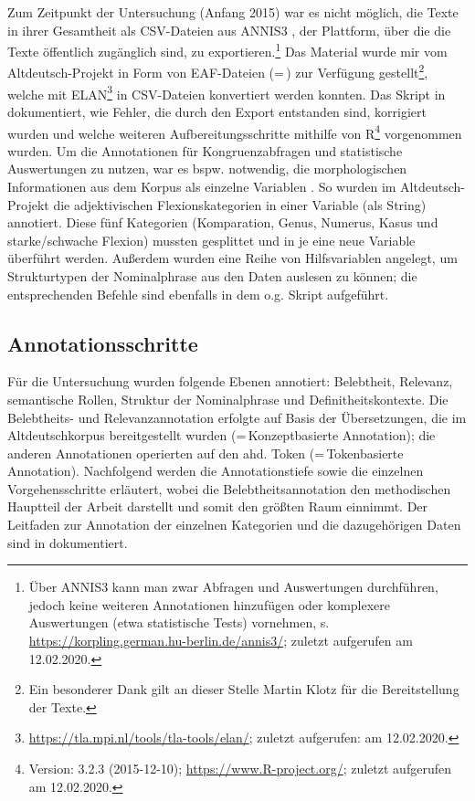 Zum Zeitpunkt der Untersuchung (Anfang 2015) war es nicht möglich, die Texte in ihrer Gesamtheit als CSV-Dateien aus ANNIS3 \parencite{Krause2016}, der Plattform, über die die Texte öffentlich zugänglich sind, zu exportieren.\footnote{Über ANNIS3 kann man zwar Abfragen und Auswertungen durchführen, jedoch keine weiteren Annotationen hinzufügen oder komplexere Auswertungen (etwa statistische Tests) vornehmen, s. \url{https://korpling.german.hu-berlin.de/annis3/}; zuletzt aufgerufen am 12.02.2020.} Das Material wurde mir vom Altdeutsch-Projekt in Form von EAF-Dateien (=\,) zur Verfügung gestellt\footnote{Ein besonderer Dank gilt an dieser Stelle Martin Klotz für die Bereitstellung der Texte.}, welche mit ELAN\footnote{\url{https://tla.mpi.nl/tools/tla-tools/elan/}; zuletzt aufgerufen: am 12.02.2020.} in CSV-Dateien konvertiert werden konnten. 
Das Skript  in \textcite{HZKYL4_2020} dokumentiert, wie Fehler, die durch den Export entstanden sind, korrigiert wurden und welche weiteren Aufbereitungsschritte mithilfe von R\footnote{Version: 3.2.3 (2015-12-10); \url{https://www.R-project.org/}; zuletzt aufgerufen am 12.02.2020.} vorgenommen wurden. 
Um die Annotationen für Kongruenzabfragen und statistische Auswertungen zu nutzen, war es bspw. notwendig, die morphologischen Informationen aus dem Korpus als einzelne Variablen . So wurden im Altdeutsch-Projekt die adjektivischen Flexionskategorien in einer Variable (als String)  annotiert. Diese fünf Kategorien (Komparation, Genus, Numerus, Kasus und starke/schwache Flexion) mussten gesplittet und in je eine neue Variable überführt werden. Außerdem wurden eine Reihe von Hilfsvariablen angelegt, um Strukturtypen der Nominalphrase aus den Daten auslesen zu können; die entsprechenden Befehle sind ebenfalls in dem o.g. Skript aufgeführt.  

\subsection{Annotationsschritte}\label{sec:annotationsschritte}

Für die Untersuchung wurden folgende Ebenen annotiert: Belebtheit, Relevanz, semantische Rollen, Struktur der Nominalphrase und Definitheitskontexte. Die Belebtheits- und Relevanzannotation erfolgte auf Basis der Übersetzungen, die im Altdeutschkorpus bereitgestellt wurden (=\,Konzeptbasierte Annotation); die anderen Annotationen operierten auf den ahd. Token  (=\,Tokenbasierte Annotation). Nachfolgend werden die Annotationstiefe sowie die einzelnen Vorgehensschritte erläutert, wobei die Belebtheitsannotation den methodischen Hauptteil der Arbeit darstellt und somit den größten Raum einnimmt. Der Leitfaden zur Annotation der einzelnen Kategorien und die dazugehörigen Daten sind in \textcite{HZKYL4_2020} dokumentiert. 

